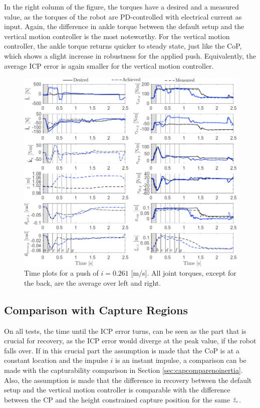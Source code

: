 In the right column of the figure, the torques have a desired and a measured value, as the torques of the robot are PD-controlled with electrical current as input. Again, the difference in ankle torque between the default setup and the vertical motion controller is the most noteworthy. For the vertical motion controller, the ankle torque returns quicker to steady state, just like the \ac{CoP}, which shows a slight increase in robustness for the applied push. Equivalently, the average \ac{ICP} error is again smaller for the vertical motion controller.
\begin{figure}
\centering
\includegraphics[width=1.0\textwidth]{STYLESTUFF/valcomparetimeHW.png}
\caption{Time plots for a push of $i=0.261$ [m/s]. All joint torques, except for the back, are the average over left and right.}
\label{fig:valcomparetimeHW}
\end{figure}


\subsection{Comparison with Capture Regions}
On all tests, the time until the \ac{ICP} error turns, can be seen as the part that is crucial for recovery, as the \ac{ICP} error would diverge at the peak value, if the robot falls over. If in this crucial part the assumption is made that the \ac{CoP} is at a constant location and the impulse $i$ is an instant impulse, a comparison can be made with the capturability comparison in Section \ref{sec:capcomparenoinertia}. Also, the assumption is made that the difference in recovery between the default setup and the vertical motion controller is comparable with the difference between the \ac{CP} and the height constrained capture position for the same $\ddot{z}_{c}$.

